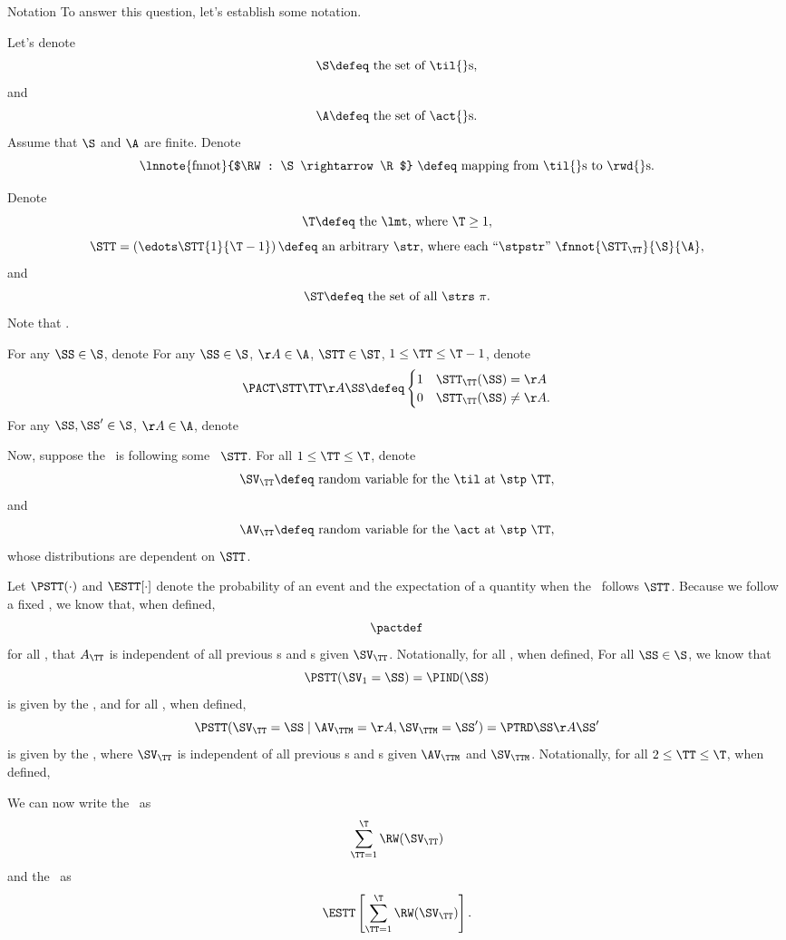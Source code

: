 \begin{part}{Notation}
  To answer this question, let's establish some notation.

  Let's denote
  $$\text{$\S \defeq$ the set of \til{}s},$$
  and 
  $$\text{$\A \defeq$ the set of \act{}s.}$$
  Assume that $\S$ and $\A$ are finite.
  Denote
  $$\text{\lnnote{fnnot}{$\RW : \S \rightarrow \R$} $\defeq$ mapping from \til{}s to \rwd{}s.}$$

  Denote
  $$\text{$\T \defeq$ the \lmt, where $\T \ge 1$},$$
  $$\text{$\STT = \left(\edots\STT{1}{\T - 1}\right) \defeq$ an arbitrary \str, 
  where each ``\stpstr'' {$\fnnot{\STT_\TT}{\S}{\A}$}},$$
  and
  $$\text{$\ST \defeq$ the set of all \strs\ $\pi$}.$$
  Note that .

  For any $\SS \in \S$, denote
  For any $\SS \in \S$, $\AA \in \A$, $\STT \in \ST$, $1 \le \TT \le \T - 1$, denote
  $$\PACT\STT\TT\AA\SS\defeq 
    \begin{cases}
      1 & \STT_\TT(\SS) = \AA\\
      0 & \STT_\TT(\SS) \ne \AA.\\
    \end{cases}
  $$
  For any $\SS,\SS' \in \S$, $\AA \in \A$, denote

  Now, suppose the \agt\ is following some \str\ $\STT$.
  For all $1 \le \TT \le \T$,
  denote
  $$\text{$\SV_\TT \defeq$ random variable for the \til\ at \stp\ $\TT$},$$
  and
  $$\text{$\AV_\TT \defeq$ random variable for the \act\ at \stp\ $\TT$},$$
  whose distributions are dependent on $\STT$.

  Let $\PSTT(\cdot)$ and $\ESTT[\cdot]$ denote the probability of an event
  and the expectation of a quantity
  when the \agt\ follows $\STT$.
  Because we follow a fixed \str, we know that, when defined,
  $$\pactdef$$
  for all
  \rchreqarng,
   that
  $A_\TT$ is independent of all previous \til{}s and \act{}s given $\SV_\TT$.
  Notationally, for all \actcindrange, when defined,
  For all $\SS \in \S$, we know that
  $$\PSTT(\SV_1 = \SS) = \PIND(\SS)$$
  is given by the \ind, and
  for all \rchreqsrng, when defined,
  $$
  \PSTT(\SV_\TT = \SS \mid \AV_\TTM = \AA, \SV_\TTM = \SS') =
  \PTRD\SS\AA{\SS'}
  $$
  is given by the \trd, where
  $\SV_\TT$ is independent of all previous \til{}s and \act{}s given $\AV_\TTM$ and $\SV_\TTM$.
  Notationally, for all $2 \le \TT \le \T$, when defined,

  We can now write the \trwd\ as
  $$\sum_{\TT = 1}^\T \RW(\SV_\TT)$$
  and the \atrwd\ as
  $$\ESTT\left[\sum_{\TT = 1}^\T \RW(\SV_\TT)\right].$$
\end{part}

